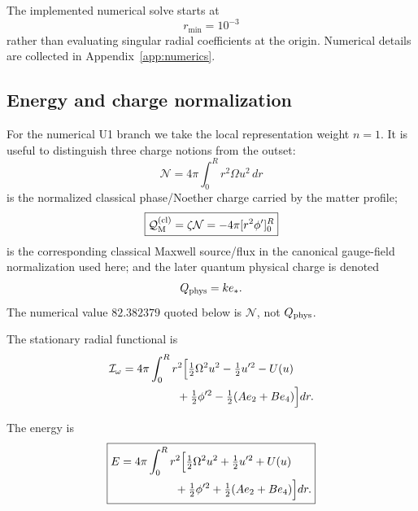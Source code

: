 \documentclass[11pt]{article}
\begin{document}
The implemented numerical solve starts at
\begin{equation}
r_{\min}=10^{-3}
\end{equation}
rather than evaluating singular radial coefficients at the origin. Numerical details are collected in Appendix~\ref{app:numerics}.

\subsection{Energy and charge normalization}

For the numerical U1 branch we take the local representation weight \(n=1\). It is useful to distinguish three charge notions from the outset:
\begin{equation}
\boxed{
\mathcal N
=
4\pi\int_0^R r^2\Omega u^2\,dr
}
\end{equation}
is the normalized classical phase/Noether charge carried by the matter profile;
\begin{equation}
\boxed{
\mathcal Q_{\rm M}^{\rm(cl)}
=
\zeta\mathcal N
=
-4\pi[r^2\phi']_0^R
}
\end{equation}
is the corresponding classical Maxwell source/flux in the canonical gauge-field normalization used here; and the later quantum physical charge is denoted
\begin{equation}
Q_{\rm phys}=k e_*.
\end{equation}
The numerical value \(82.382379\) quoted below is \(\mathcal N\), not \(Q_{\rm phys}\).

The stationary radial functional is
\begin{equation}
\begin{aligned}
\mathcal I_\omega
={}&4\pi\int_0^R r^2\Bigl[
\tfrac12\Omega^2u^2-\tfrac12u'^2-U(u)
\\
&\hspace{3.5em}
+\tfrac12\phi'^2-\tfrac12(Ae_2+B e_4)
\Bigr]dr.
\end{aligned}
\end{equation}

The energy is
\begin{equation}
\boxed{
\begin{aligned}
E
={}&4\pi\int_0^R r^2\Bigl[
\tfrac12\Omega^2u^2+\tfrac12u'^2+U(u)
\\
&\hspace{3.5em}
+\tfrac12\phi'^2+\tfrac12(Ae_2+B e_4)
\Bigr]dr.
\end{aligned}
}
\end{equation}
\end{document}
